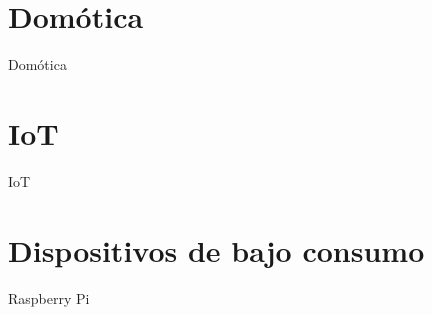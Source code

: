 \section{Domótica}

Domótica

\section{IoT}

IoT

\section{Dispositivos de bajo consumo}

Raspberry Pi